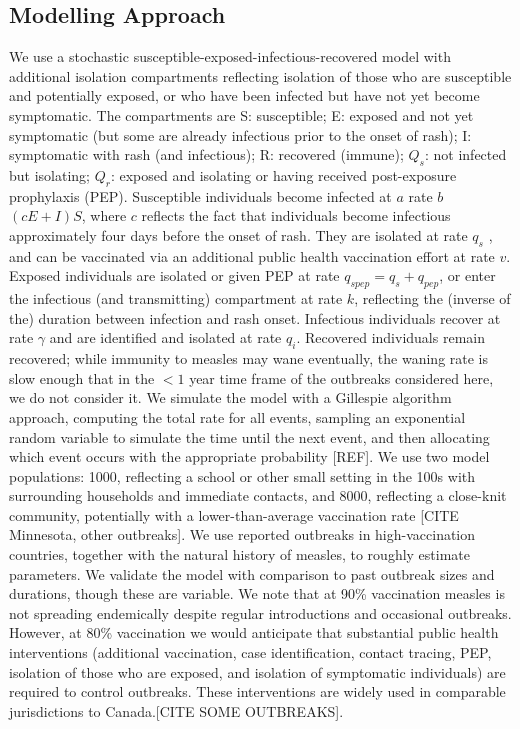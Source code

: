 \documentclass[12pt,a4paper]{article}
\begin{document}
\subsection{Modelling Approach}
We use a stochastic susceptible-exposed-infectious-recovered model with additional isolation compartments reflecting isolation of those who are susceptible and potentially exposed, or who have been infected but have not yet become symptomatic. The compartments are S: susceptible; E: exposed and not yet symptomatic (but some are already infectious prior to the onset of rash); I: symptomatic with rash (and infectious); R: recovered (immune); $Q_s$: not infected but isolating; $Q_r$: exposed and isolating or having received post-exposure prophylaxis (PEP). Susceptible individuals become infected at $a$ rate $b$ $(cE + I) S$, where $c$ reflects the fact that individuals become infectious approximately four days before the onset of rash. They are isolated at rate $q_s$ , and can be vaccinated via an additional public health vaccination effort at rate $v$. Exposed individuals are isolated or given PEP at rate $q_{spep}  = q_s + q_{pep}$, or enter the infectious (and transmitting) compartment at rate $k$, reflecting the (inverse of the) duration between infection and rash onset. Infectious individuals recover at rate $\gamma$ and are identified and isolated at rate $q_i$. Recovered individuals remain recovered; while immunity to measles may wane eventually, the waning rate is slow enough that in the $<1$ year time frame of the outbreaks considered here, we do not consider it.  We simulate the model with a Gillespie algorithm approach, computing the total rate for all events, sampling an exponential random variable to simulate the time until the next event, and then allocating which event occurs with the appropriate probability [REF].
We use two model populations: 1000, reflecting a school or other small setting in the 100s with surrounding households and immediate contacts, and 8000, reflecting a close-knit community, potentially with a lower-than-average vaccination rate [CITE Minnesota, other outbreaks].
We use reported outbreaks in high-vaccination countries, together with the natural history of measles, to roughly estimate parameters. We validate the model with comparison to past outbreak sizes and durations, though these are variable. We note that at 90\% vaccination measles is not spreading endemically despite regular introductions and occasional outbreaks. However, at 80\% vaccination we would anticipate that substantial public health interventions (additional vaccination, case identification, contact tracing, PEP, isolation of those who are exposed, and isolation of symptomatic individuals) are required to control outbreaks. These interventions are widely used in comparable jurisdictions to Canada.[CITE SOME OUTBREAKS].
\end{document}
